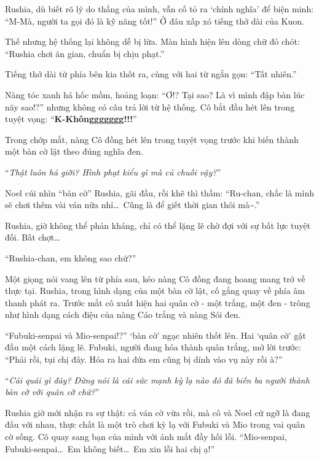 \documentclass[../main.tex]{subfiles}
\begin{document}
Rushia, dù biết rõ lý do thắng của mình, vẫn cố tỏ ra `chính nghĩa' để biện minh: ``M-Mà, người ta gọi đó là kỹ năng tốt!'' Ở đâu xấp xó tiếng thở dài của Kuon.

Thế nhưng hệ thống lại không dễ bị lừa. Màn hình hiện lên dòng chữ đỏ chót: ``Rushia chơi ăn gian, chuẩn bị chịu phạt.''

Tiếng thở dài từ phía bên kia thốt ra, cùng với hai từ ngắn gọn: ``Tất nhiên.''

Nàng tóc xanh há hốc mồm, hoảng loạn: ``Ơ!? Tại sao? Là vì mình đập bàn lúc nãy sao!?'' nhưng không có câu trả lời từ hệ thống. Cô bắt đầu hét lên trong tuyệt vọng: ``\textbf{K-Khônggggggg!!!}''

Trong chớp mắt, nàng Cô đồng hét lên trong tuyệt vọng trước khi biến thành một bàn cờ lật theo đúng nghĩa đen.


``\textit{Thật luôn hả giời? Hình phạt kiểu gì mà củ chuối vậy?}''

Noel cúi nhìn ``bàn cờ'' Rushia, gãi đầu, rồi khẽ thì thầm: ``Ru-chan, chắc là mình sẽ chơi thêm vài ván nữa nhỉ\dots\ Cũng là để giết thời gian thôi mà\~{}.''

Rushia, giờ không thể phản kháng, chỉ có thể lặng lẽ chờ đợi với sự bất lực tuyệt đối. Bất chợt\dots

``Rushia-chan, em không sao chứ?''

Một giọng nói vang lên từ phía sau, kéo nàng Cô đồng đang hoang mang trở về thực tại. Rushia, trong hình dạng của một bàn cờ lật, cố gắng quay về phía âm thanh phát ra. Trước mắt cô xuất hiện hai quân cờ - một trắng, một đen - trông như hình dạng cách điệu của nàng Cáo trắng và nàng Sói đen.


``Fubuki-senpai và Mio-senpai!?'' `bàn cờ' ngạc nhiên thốt lên. Hai `quân cờ' gật đầu một cách lặng lẽ. Fubuki, người đang hóa thành quân trắng, mở lời trước: ``Phải rồi, tụi chị đây. Hóa ra hai đứa em cũng bị dính vào vụ này rồi à?''

``\textit{Cái quái gì đây? Đừng nói là cái sức mạnh kỳ lạ nào đó đã biến ba người thành bàn cờ với quân cờ chứ?}''

Rushia giờ mới nhận ra sự thật: cả ván cờ vừa rồi, mà cô và Noel cứ ngỡ là đang đấu với nhau, thực chất là một trò chơi kỳ lạ với Fubuki và Mio trong vai quân cờ sống. Cô quay sang bạn của mình với ánh mắt đầy hối lỗi. ``Mio-senpai, Fubuki-senpai\dots\ Em không biết\dots\ Em xin lỗi hai chị ạ!''
\end{document}
